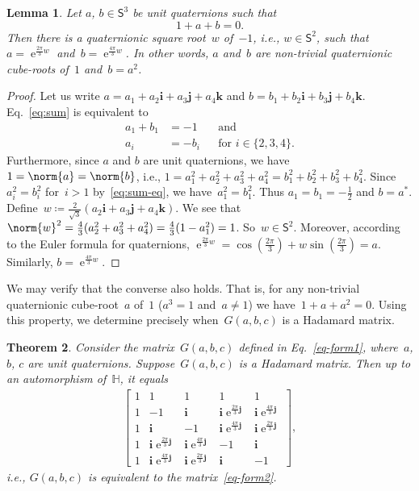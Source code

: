 \documentclass[12pt]{article}
\numberwithin{equation}{section}
\newtheorem{theorem}{Theorem}
\newtheorem{lemma}[theorem]{Lemma}
\newcommand{\qi}{\mathbf{i}}
\newcommand{\qj}{\mathbf{j}}
\newcommand{\qk}{\mathbf{k}}
\newcommand{\HH}{\mathbb{H}}
\newcommand{\eqdef}{\coloneqq}
\newcommand{\eq}{=}
\DeclareMathOperator{\e}{e}
\newcommand{\qsphere}{{\mathsf S}}
\begin{document}
\begin{lemma} 
\label{lemma_sum}
Let $a$, $b\in \qsphere^3$ be unit quaternions such that
    \begin{equation}
        1+a+b \eq 0 . \label{eq:sum}
    \end{equation}
Then there is a quaternionic square root~$w$ of~$-1$, i.e., $w \in \qsphere^2$, such that $a = \e^{\frac{2\pi}{3} w}$ and~$b = \e^{\frac{4\pi}3 w}$.
In other words, $a$ and~$b$ are non-trivial quaternionic cube-roots of~$1$ and~$b = a^2$.
\end{lemma}
\begin{proof}
Let us write $a = a_1 + a_2\qi + a_3\qj + a_4\qk$ and $b = b_1 + b_2\qi + b_3\qj + b_4\qk$. 
Eq.~\eqref{eq:sum} is equivalent to
\begin{equation}
\label{eq:sum-eq} 
    \begin{aligned}
            a_1 + b_1 & = -1 && \text{and} \\
            a_i & = -b_i && \text{for $i \in \{2,3,4\}$}.
    \end{aligned} 
\end{equation}
Furthermore, since $a$ and $b$ are unit quaternions, we have $1 = \norm{a} = \norm{b}$, i.e., $1 = a_1^2 + a_2^2 + a_3^2 + a_4^2 = b_1^2 + b_2^2 + b_3^2 + b_4^2$. Since~$a_i^2 = b_i^2$ for~$i > 1$ by~\eqref{eq:sum-eq}, we have~$a_1^2 = b_1^2$.
Thus $a_1 = b_1 = -\frac12$ and $b = a^*$. Define~$w \eqdef \frac{2}{\sqrt{3}} (a_2\qi + a_3\qj + a_4\qk)$. 
We see that $\norm{w}^2 = \frac{4}{3} (a_2^2 + a_3^2 + a_4^2) =\frac{4}{3}(1 - a_1^2) = 1$. So~$w \in \qsphere^2$. Moreover, according to the Euler formula for quaternions, $\e^{\frac{2\pi}{3} w} = \cos(\frac{2\pi}{3}) + w\sin(\frac{2\pi}{3}) = a$. Similarly, $b = \e^{\frac{4\pi}{3}w}$.
\end{proof}
We may verify that the converse also holds.
That is, for any non-trivial quaternionic cube-root~$a$ of~$1$ ($a^3 = 1$ and~$a \neq 1$) we have~$1 + a + a^2 = 0$.
Using this property, we determine precisely when~$G(a,b,c)$ is a Hadamard matrix.
\begin{theorem}
\label{thm-gabc-characterization}
Consider the matrix\/~$G(a,b,c)$ defined in Eq.~\eqref{eq-form1}, where~$a$, $b$, $c$ are unit quaternions.
Suppose\/~$G(a,b,c)$ is a Hadamard matrix. Then up to an automorphism of\/~$\HH$, it equals
\begin{align}
\begin{bmatrix}
1 &1  &1  &1  &1  \\
1 &-1  &\qi  &\qi \e^{\frac{2\pi}{3} \qj}  & \qi \e^{\frac{4\pi}{3} \qj}  \\
1 &\qi  &-1  &\qi \e^{\frac{4\pi}{3} \qj}  &\qi \e^{\frac{2\pi}{3} \qj}  \\
1 &\qi \e^{\frac{2\pi}{3} \qj}  & \qi \e^{\frac{4\pi}{3} \qj}  &-1  &\qi  \\
1 &\qi \e^{\frac{4\pi}{3} \qj} &\qi \e^{\frac{2\pi}{3} \qj}  &\qi  &-1 
\end{bmatrix} ,
\label{eq-form2}
\end{align}
i.e., $G(a,b,c)$ is equivalent to the matrix~\eqref{eq-form2}.
\end{theorem}
\end{document}
